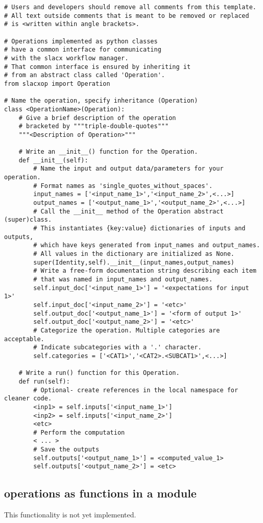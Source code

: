 \begin{lstlisting}
# Users and developers should remove all comments from this template.
# All text outside comments that is meant to be removed or replaced 
# is <written within angle brackets>.

# Operations implemented as python classes 
# have a common interface for communicating 
# with the slacx workflow manager.
# That common interface is ensured by inheriting it
# from an abstract class called 'Operation'.
from slacxop import Operation

# Name the operation, specify inheritance (Operation)
class <OperationName>(Operation):
    # Give a brief description of the operation
    # bracketed by """triple-double-quotes"""
    """<Description of Operation>"""

    # Write an __init__() function for the Operation.
    def __init__(self):
        # Name the input and output data/parameters for your operation.
        # Format names as 'single_quotes_without_spaces'.
        input_names = ['<input_name_1>','<input_name_2>',<...>]
        output_names = ['<output_name_1>','<output_name_2>',<...>]
        # Call the __init__ method of the Operation abstract (super)class.
        # This instantiates {key:value} dictionaries of inputs and outputs, 
        # which have keys generated from input_names and output_names.
        # All values in the dictionary are initialized as None. 
        super(Identity,self).__init__(input_names,output_names)
        # Write a free-form documentation string describing each item
        # that was named in input_names and output_names.
        self.input_doc['<input_name_1>'] = '<expectations for input 1>'
        self.input_doc['<input_name_2>'] = '<etc>'
        self.output_doc['<output_name_1>'] = '<form of output 1>'
        self.output_doc['<output_name_2>'] = '<etc>'
        # Categorize the operation. Multiple categories are acceptable.
        # Indicate subcategories with a '.' character.
        self.categories = ['<CAT1>','<CAT2>.<SUBCAT1>',<...>]
        
    # Write a run() function for this Operation.
    def run(self):
        # Optional- create references in the local namespace for cleaner code.
        <inp1> = self.inputs['<input_name_1>']
        <inp2> = self.inputs['<input_name_2>']
        <etc>
        # Perform the computation
        < ... >
        # Save the outputs
        self.outputs['<output_name_1>'] = <computed_value_1>
        self.outputs['<output_name_2>'] = <etc>
\end{lstlisting}


\subsection{operations as functions in a module}
\label{sec:op_dev_by_function}

This functionality is not yet implemented.

